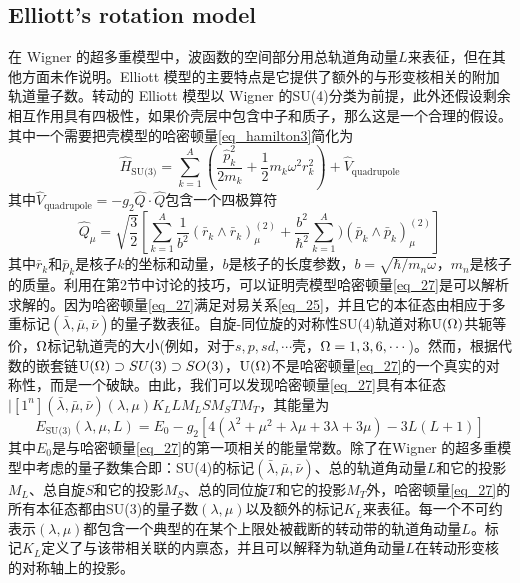 \subsection{Elliott's rotation model}

在 Wigner 的超多重模型中，波函数的空间部分用总轨道角动量$L$来表征，但在其他方面未作说明。Elliott 模型的主要特点是它提供了额外的与形变核相关的附加轨道量子数。转动的 Elliott 模型以 Wigner 的SU(4)分类为前提，此外还假设剩余相互作用具有四极性，如果价壳层中包含中子和质子，那么这是一个合理的假设。其中一个需要把壳模型的哈密顿量\ref{eq_hamilton3}简化为
\begin{equation}\label{eq_27}
\hat{H}_\textrm{SU(3)}=\sum_{k=1}^A\left(\frac{\hat{p}^2_k}{2m_k}+\frac{1}{2}m_k\omega^2r^2_k\right)+\hat{V}_\textrm{quadrupole}
\end{equation}
其中$\hat{V}_\textrm{quadrupole}=-g_2\hat{Q}\cdot\hat{Q}$包含一个四极算符
\begin{equation}\label{eq_28}
\hat{Q}_\mu=\sqrt{\frac{3}{2}}\left[\sum_{k=1}^A\frac{1}{b^2}(\bar{r}_k\wedge\bar{r}_k)_\mu^{(2)}+\frac{b^2}{\hbar^2}\sum_{k=1}^A)(\bar{p}_k\wedge\bar{p}_k)_\mu^{(2)}\right]
\end{equation}
其中$\bar{r}_k$和$\bar{p}_k$是核子$k$的坐标和动量，$b$是核子的长度参数，$b=\sqrt{\hbar/m_n\omega}$，$m_n$是核子的质量。利用在第2节中讨论的技巧，可以证明壳模型哈密顿量\ref{eq_27}是可以解析求解的。因为哈密顿量\ref{eq_27}满足对易关系\ref{eq_25}，并且它的本征态由相应于多重标记$(\bar{\lambda},\bar{\mu},\bar{\nu})$的量子数表征。自旋-同位旋的对称性SU(4)轨道对称${\rm U(\Omega)}$共轭等价，${\rm \Omega}$标记轨道壳的大小(例如，对于$s, p, sd,\cdots$壳，${\rm \Omega}=1,3,6,\cdots $)。然而，根据代数的嵌套链${\rm U(\Omega)}\supset SU(3)\supset SO(3)$，${\rm U(\Omega)}$不是哈密顿量\ref{eq_27}的一个真实的对称性，而是一个破缺。由此，我们可以发现哈密顿量\ref{eq_27}具有本征态$|[1^n](\bar{\lambda},\bar{\mu},\bar{\nu})(\lambda,\mu)K_LLM_LSM_STM_T$，其能量为
\begin{equation*}
E_\textrm{SU(3)}(\lambda,\mu,L)=E_0-g_2[4(\lambda^2+\mu^2+\lambda\mu+3\lambda+3\mu)-3L(L+1)]
\end{equation*}
其中$E_0$是与哈密顿量\ref{eq_27}的第一项相关的能量常数。除了在Wigner 的超多重模型中考虑的量子数集合即：SU(4)的标记$(\bar{\lambda},\bar{\mu},\bar{\nu})$、总的轨道角动量$L$和它的投影$M_L$、总自旋$S$和它的投影$M_S$、总的同位旋$T$和它的投影$M_T$外，哈密顿量\ref{eq_27}的所有本征态都由SU(3)的量子数$(\lambda,\mu)$以及额外的标记$K_L$来表征。每一个不可约表示$(\lambda,\mu)$都包含一个典型的在某个上限处被截断的转动带的轨道角动量$L$。标记$K_L$定义了与该带相关联的内禀态，并且可以解释为轨道角动量$L$在转动形变核的对称轴上的投影。


